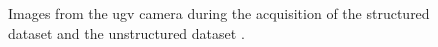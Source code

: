 \begin{figure}[h]
    \centering
    \caption{Images from the \gls{ugv} camera during the acquisition of the structured dataset \protect{} and the unstructured dataset \protect{}.}
    \label{fig:slam_views}
\end{figure}

